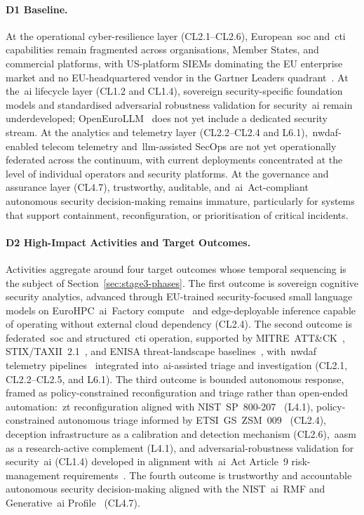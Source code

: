 \documentclass{ieeeaccess}
\begin{document}
\paragraph{D1 Baseline.}
At the operational cyber-resilience layer (CL2.1--CL2.6), European~\gls{soc} and~\gls{cti} capabilities remain fragmented across organisations, Member States, and commercial platforms, with US-platform SIEMs dominating the EU enterprise market and no EU-headquartered vendor in the Gartner Leaders quadrant~\cite{gartner2025siem}. At the~\gls{ai} lifecycle layer (CL1.2 and CL1.4), sovereign security-specific foundation models and standardised adversarial robustness validation for security~\gls{ai} remain underdeveloped; OpenEuroLLM~\cite{openeurollm2025} does not yet include a dedicated security stream. At the analytics and telemetry layer (CL2.2--CL2.4 and L6.1),~\gls{nwdaf}-enabled telecom telemetry and~\gls{llm}-assisted SecOps are not yet operationally federated across the continuum, with current deployments concentrated at the level of individual operators and security platforms. At the governance and assurance layer (CL4.7), trustworthy, auditable, and~\gls{ai}~Act-compliant autonomous security decision-making remains immature, particularly for systems that support containment, reconfiguration, or prioritisation of critical incidents.

\paragraph{D2 High-Impact Activities and Target Outcomes.}
Activities aggregate around four target outcomes whose temporal sequencing is the subject of Section~\ref{sec:stage3-phases}. The first outcome is sovereign cognitive security analytics, advanced through EU-trained security-focused small language models on EuroHPC~\gls{ai}~Factory compute~\cite{eurohpcaifactories} and edge-deployable inference capable of operating without external cloud dependency (CL2.4). The second outcome is federated~\gls{soc} and structured~\gls{cti} operation, supported by MITRE~ATT\&CK~\cite{mitre2020}, STIX/TAXII~2.1~\cite{stix21,taxii21}, and ENISA threat-landscape baselines~\cite{enisaetl2025}, with~\gls{nwdaf} telemetry pipelines~\cite{tgpp23288} integrated into~\gls{ai}-assisted triage and investigation (CL2.1, CL2.2--CL2.5, and L6.1). The third outcome is bounded autonomous response, framed as policy-constrained reconfiguration and triage rather than open-ended automation:~\gls{zt} reconfiguration aligned with NIST~SP~800-207~\cite{rose2020zta} (L4.1), policy-constrained autonomous triage informed by ETSI~GS~ZSM~009~\cite{etsizsm} (CL2.4), deception infrastructure as a calibration and detection mechanism (CL2.6),~\gls{aasm} as a research-active complement (L4.1), and adversarial-robustness validation for security~\gls{ai} (CL1.4) developed in alignment with~\gls{ai}~Act Article~9 risk-management requirements~\cite{euaiact}. The fourth outcome is trustworthy and accountable autonomous security decision-making aligned with the NIST~\gls{ai}~RMF and Generative~\gls{ai} Profile~\cite{nistairmf,nistaigenai} (CL4.7).
\end{document}
